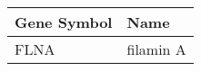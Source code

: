 \begin{tabular}{ll}
\toprule
Gene Symbol &      Name \\
\midrule
       FLNA & filamin A \\
\bottomrule
\end{tabular}
